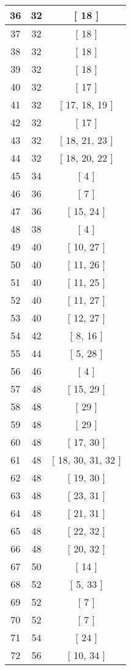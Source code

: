 \begin{center}
\begin{longtable}[H]{|| c c c ||}
36 & 32 & [ 18 ] \\ 
\hline
37 & 32 & [ 18 ] \\ 
\hline
38 & 32 & [ 18 ] \\ 
\hline
39 & 32 & [ 18 ] \\ 
\hline
40 & 32 & [ 17 ] \\ 
\hline
41 & 32 & [ 17, 18, 19 ] \\ 
\hline
42 & 32 & [ 17 ] \\ 
\hline
43 & 32 & [ 18, 21, 23 ] \\ 
\hline
44 & 32 & [ 18, 20, 22 ] \\ 
\hline
45 & 34 & [ 4 ] \\ 
\hline
46 & 36 & [ 7 ] \\ 
\hline
47 & 36 & [ 15, 24 ] \\ 
\hline
48 & 38 & [ 4 ] \\ 
\hline
49 & 40 & [ 10, 27 ] \\ 
\hline
50 & 40 & [ 11, 26 ] \\ 
\hline
51 & 40 & [ 11, 25 ] \\ 
\hline
52 & 40 & [ 11, 27 ] \\ 
\hline
53 & 40 & [ 12, 27 ] \\ 
\hline
54 & 42 & [ 8, 16 ] \\ 
\hline
55 & 44 & [ 5, 28 ] \\ 
\hline
56 & 46 & [ 4 ] \\ 
\hline
57 & 48 & [ 15, 29 ] \\ 
\hline
58 & 48 & [ 29 ] \\ 
\hline
59 & 48 & [ 29 ] \\ 
\hline
60 & 48 & [ 17, 30 ] \\ 
\hline
61 & 48 & [ 18, 30, 31, 32 ] \\ 
\hline
62 & 48 & [ 19, 30 ] \\ 
\hline
63 & 48 & [ 23, 31 ] \\ 
\hline
64 & 48 & [ 21, 31 ] \\ 
\hline
65 & 48 & [ 22, 32 ] \\ 
\hline
66 & 48 & [ 20, 32 ] \\ 
\hline
67 & 50 & [ 14 ] \\ 
\hline
68 & 52 & [ 5, 33 ] \\ 
\hline
69 & 52 & [ 7 ] \\ 
\hline
70 & 52 & [ 7 ] \\ 
\hline
71 & 54 & [ 24 ] \\ 
\hline
72 & 56 & [ 10, 34 ] \\ 

\end{longtable}
\end{center}
